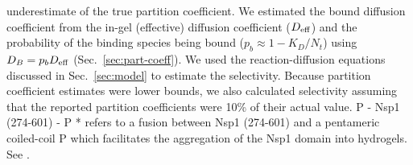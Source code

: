 \begin{table}[h!]
{  underestimate of the true partition coefficient. We estimated
  the bound diffusion
  coefficient  from the in-gel (effective)
  diffusion coefficient ($D_{\mathrm{eff}}$) and the probability of the
  binding species being bound ($p_b \approx 1-K_D/N_t$) using $D_B =
  p_bD_{\mathrm{eff}}$ (Sec.~\ref{sec:part-coeff}). We used the reaction-diffusion equations
  discussed in Sec.~\ref{sec:model} to estimate the selectivity.  Because
  partition coefficient estimates were lower bounds, we also
  calculated selectivity
  assuming that the reported
  partition coefficients were 10\% of their actual value. P -
  Nsp1 (274-601) - P * refers to a fusion between Nsp1 (274-601) and
  a pentameric coiled-coil P which facilitates the aggregation of
  the Nsp1 domain into hydrogels.  See \cite{kim15}.     \label{table:Gorlich}}                \end{table}